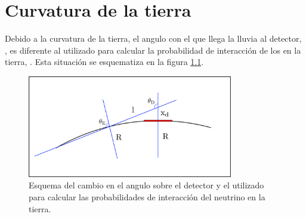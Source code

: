 \chapter{Curvatura de la tierra}

	
	Debido a la curvatura de la tierra, el angulo con el que llega la lluvia al detector, \td{}, es diferente al utilizado para calcular la probabilidad de interacci\'on de los \nutau{} en la tierra, \te{}.
	Esta situaci\'on se esquematiza en la figura \ref{fig:curveEarthSketch}.
	
	\begin{figure}[ht!]
		\centering
		\includegraphics[width=0.8\textwidth]{./fig/appendix/curveEarthSketch.png}
		\caption{\label{fig:curveEarthSketch}
		Esquema del cambio en el angulo sobre el detector y el utilizado para calcular las probabilidades de interacci\'on del neutrino en la tierra.
		}
	\end{figure}
	
